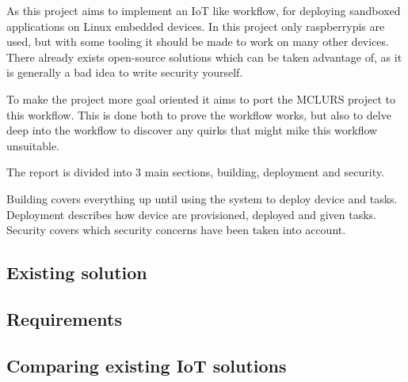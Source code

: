 \documentclass[../../main.tex]{subfiles}
\begin{document}
As this project aims to implement an IoT like workflow, for deploying sandboxed applications
on Linux embedded devices. In this project only raspberrypis are used, but with some
tooling it should be made to work on many other devices.\\

There already exists open-source solutions which can be taken advantage of, as it is generally a bad
idea to write security yourself.

To make the project more goal oriented it aims to port the MCLURS project to this workflow.
This is done both to prove the workflow works, but also to delve deep into the workflow
to discover any quirks that might mike this workflow unsuitable.

The report is divided into 3 main sections, building, deployment and security.

Building covers everything up until using the system to deploy device and tasks.
Deployment describes how device are provisioned, deployed and given tasks.
Security covers which security concerns have been taken into account.


\subsection{Existing solution}%
\label{sub:existing_solution}


\subsection{Requirements}%
\label{sub:requirements}


\subsection{Comparing existing IoT solutions}%
\label{sub:comparing_existing_iot_solutions}

	
\end{document}
